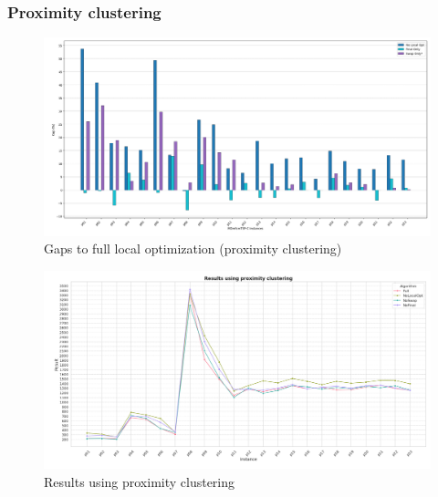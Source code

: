 \documentclass{article}
\begin{document}
	\subsubsection{Proximity clustering}
	\;
	\begin{figure}[hb!]
		\centering
		\caption{Gaps to full local optimization (proximity clustering)}
		\includegraphics[width=\textwidth]{local_opt_comp_to_full_proximity}
	\end{figure}
	\begin{figure}[hb!]
		\centering
		\caption{Results using proximity clustering}
		\includegraphics[width=\textwidth]{Results_proximity}
	\end{figure}

	\clearpage
\end{document}
